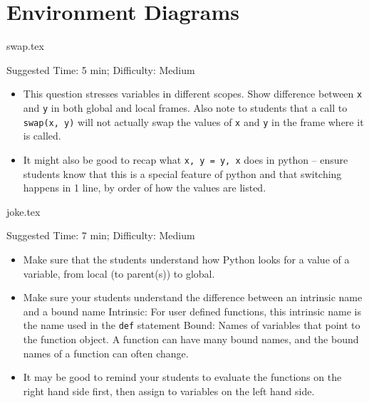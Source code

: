 \documentclass{exam}
\begin{document}
\section{Environment Diagrams}
\begin{questions}
    {swap.tex}
    \begin{questionmeta}
        Suggested Time: 5 min; Difficulty: Medium
        \begin{itemize}
            \item This question stresses variables in different scopes. 
            \subitem Show difference between \lstinline{x} and \lstinline{y} in both global and local frames.
            \subitem Also note to students that a call to \lstinline{swap(x, y)} will not actually swap the values of \lstinline{x} and \lstinline{y} in the frame where it is called.
            \item It might also be good to recap what \lstinline{x, y = y, x} does in python -- ensure students know that this is a special feature of python and that switching happens in 1 line, by order of how the values are listed. 
        \end{itemize}
      \end{questionmeta}
    {joke.tex}
    \begin{questionmeta}
        Suggested Time: 7 min; Difficulty: Medium
        \begin{itemize}
            \item Make sure that the students understand how Python looks for a value of a variable, from local (to parent(s)) to global.
            \item Make sure your students understand the difference between an intrinsic name and a bound name
            \subitem Intrinsic: For user defined functions, this intrinsic name is the name used in the \lstinline{def} statement 
            \subitem Bound: Names of variables that point to the function object. A function can have many bound names, and the bound names of a function can often change. 
            \item It may be good to remind your students to evaluate the functions on the right hand side first, then assign to variables on the left hand side.
        \end{itemize}    
      \end{questionmeta}
          
\end{questions}
\end{document}
